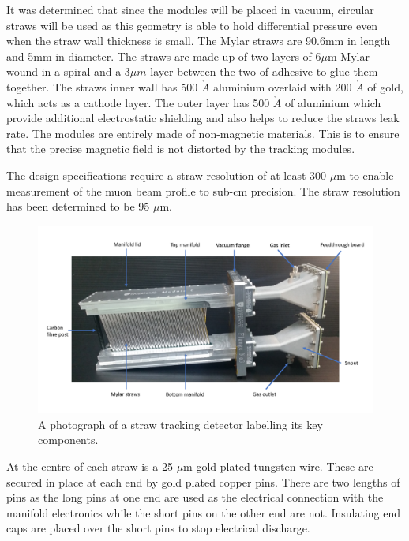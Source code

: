 It was determined that since the modules will be placed in vacuum, circular straws will be used as this geometry is able to hold differential pressure even when the straw wall thickness is small. The Mylar straws are 90.6mm in length and 5mm in diameter. The straws are made up of two layers of 6${\mu}$m Mylar wound in a spiral and a 3$\mu{m}$ layer between the two of adhesive to glue them together. The straws inner wall has 500 $\mathring{A}$ aluminium overlaid with 200 $\mathring{A}$ of gold, which acts as a cathode layer. The outer layer has 500 $\mathring{A}$ of aluminium which provide additional electrostatic shielding and also helps to reduce the straws leak rate\cite{Reference29}. The modules are entirely made of non-magnetic materials. This is to ensure that the precise magnetic field is not distorted by the tracking modules. 

The design specifications require a straw resolution of at least 300 $\mu$m to enable measurement of the muon beam profile to sub-cm precision. The straw resolution has been determined to be 95 $\mu$m.

\begin{figure}[th]
\centering
\includegraphics[scale=0.5]{Figures/labeledstrawtracker.pdf}
\decoRule
\caption{A photograph of a straw tracking detector labelling its key components.}
\label{fig:labeledstrawtracker}
\end{figure}

At the centre of each straw is a 25 $\mu$m gold plated tungsten wire. These are secured in place at each end by gold plated copper pins. There are two lengths of pins as the long pins at one end are used as the electrical connection with the manifold electronics while the short pins on the other end are not. Insulating end caps are placed over the short pins to stop electrical discharge.

